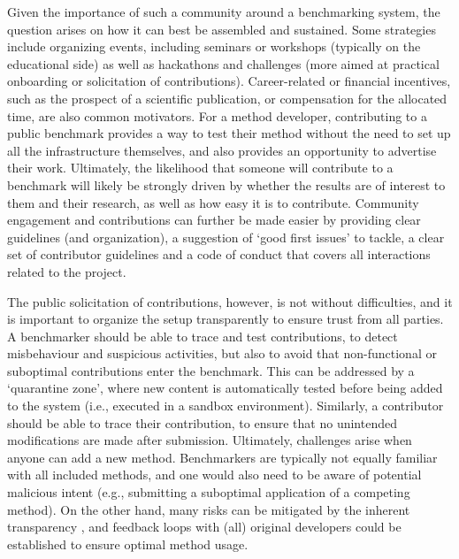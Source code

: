 \documentclass[11pt]{article}
\begin{document}
Given the importance of such a community around a benchmarking system, the question arises on how it can best be assembled and sustained. Some strategies include organizing events, including seminars or workshops (typically on the educational side) as well as hackathons and challenges (more aimed at practical onboarding or solicitation of contributions). Career-related or financial incentives, such as the prospect of a scientific publication, or compensation for the allocated time, are also common motivators. For a method developer, contributing to a public benchmark provides a way to test their method without the need to set up all the infrastructure themselves, and also provides an opportunity to advertise their work. Ultimately, the likelihood that someone will contribute to a benchmark will likely be strongly driven by whether the results are of interest to them and their research, as well as how easy it is to contribute. Community engagement and contributions can further be made easier by providing clear guidelines (and organization), a suggestion of `good first issues' to tackle, a clear set of contributor guidelines and a code of conduct that covers all interactions related to the project.

The public solicitation of contributions, however, is not without difficulties, and it is important to organize the setup transparently to ensure trust from all parties. A benchmarker should be able to trace and test contributions, to detect misbehaviour and suspicious activities, but also to avoid that non-functional or suboptimal contributions enter the benchmark. This can be addressed by a `quarantine zone', where new content is automatically tested before being added to the system (i.e., executed in a sandbox environment). Similarly, a contributor should be able to trace their contribution, to ensure that no unintended modifications are made after submission. Ultimately, challenges arise when anyone can add a new method. Benchmarkers are typically not equally familiar with all included methods, and one would also need to be aware of potential malicious intent (e.g., submitting a suboptimal application of a competing method). On the other hand, many risks can be mitigated by the inherent transparency \cite{Greenstein2016-os}, and feedback loops with (all) original developers could be established to ensure optimal method usage.
\end{document}
